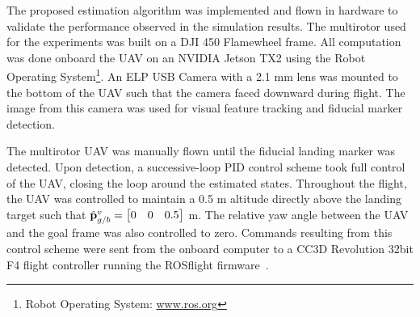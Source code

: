 
The proposed estimation algorithm was implemented and flown in
hardware to validate the performance observed in the simulation
results. The multirotor used for the experiments was built on a DJI 450 Flamewheel
frame. All computation was done onboard the UAV on an NVIDIA Jetson TX2 using
the Robot Operating System\footnote{Robot Operating System:
\url{www.ros.org}}.
An ELP
USB Camera with a 2.1 mm lens was mounted to the bottom of the UAV such that the
camera faced downward during flight. The image from this camera was used for visual
feature tracking and fiducial marker detection.

The multirotor UAV was manually flown until the fiducial landing marker was
detected.
Upon detection, a successive-loop PID control scheme took full control of the
UAV, closing the loop around the
estimated states. Throughout the flight, the UAV was controlled to maintain a
0.5 m altitude directly above the landing target such that $\hat{\boldsymbol{\mathrm{p}}}_{g/b}^v =
\begin{bmatrix} 0 & 0 & 0.5 \end{bmatrix}$ m.
The relative yaw
angle between the UAV and the goal frame was also controlled to zero.
Commands resulting from this control scheme were sent from
the onboard computer to a CC3D Revolution 32bit F4 flight controller running
the ROSflight firmware~\cite{jackson2016rosflight}.

